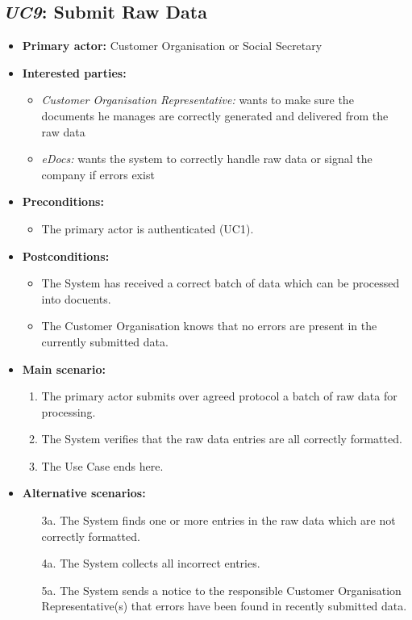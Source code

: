 \documentclass[a4paper,10pt]{article}
\begin{document}
\subsection{\emph{UC9}: Submit Raw Data}
\begin{itemize}
    \item \textbf{Primary actor:} Customer Organisation or Social Secretary
    \item \textbf{Interested parties:} 
        \begin{itemize}
            \item \textit{Customer Organisation Representative:} wants to make sure the documents he manages are correctly generated and delivered from the raw data
            \item \textit{eDocs:} wants the system to correctly handle raw data or signal the company if errors exist
        \end{itemize}

    \item \textbf{Preconditions:}
        \begin{itemize}
            \item The primary actor is authenticated (UC1).
        \end{itemize}

    \item \textbf{Postconditions:}
        \begin{itemize}
            \item The System has received a correct batch of data which can be processed into docuents.
            \item The Customer Organisation knows that no errors are present in the currently submitted data.
        \end{itemize}
        
    \item \textbf{Main scenario:} 
    \begin{enumerate}
       \item The primary actor submits over agreed protocol a batch of raw data for processing.
       \item The System verifies that the raw data entries are all correctly formatted.
       \item The Use Case ends here.
    \end{enumerate}

    \item \textbf{Alternative scenarios:} 
    \begin{enumerate}
        \item [3a.] The System finds one or more entries in the raw data which are not correctly formatted.
        \item [4a.] The System collects all incorrect entries.
        \item [5a.] The System sends a notice to the responsible Customer Organisation Representative(s) that errors have been found in recently submitted data.
    \end{enumerate}
    

\end{itemize}
\end{document}
